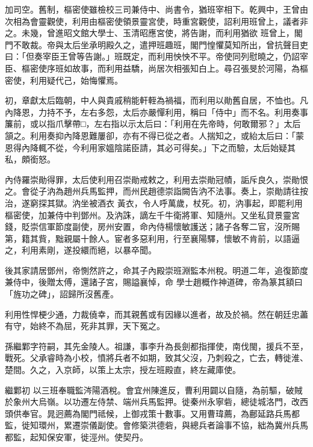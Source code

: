 \begin{pinyinscope}
 加司空。舊制，樞密使雖檢校三司兼侍中、尚書令，猶班宰相下。乾興中，王曾由次相為會靈觀使，利用由樞密使領景靈宮使，時重宮觀使，詔利用班曾上，議者非之。未幾，曾進昭文館大學士、玉清昭應宮使，將告謝，而利用猶欲
 班曾上，閣門不敢裁。帝與太后坐承明殿久之，遣押班趣班，閣門惶懼莫知所出，曾抗聲目吏曰：「但奏宰臣王曾等告謝。」班既定，而利用怏怏不平。帝使同列慰曉之，仍詔宰臣、樞密使序班如故事，而利用益驕，尚居次相張知白上。尋召張旻於河陽，為樞密使，利用疑代己，始悔懼焉。



 初，章獻太后臨朝，中人與貴戚稍能軒輊為禍福，而利用以勛舊自居，不恤也。凡內降恩，力持不予，左右多怨，太后亦嚴憚利用，稱曰「侍中」而不名。利用奏事
 簾前，或以指爪擊帶□，左右指以示太后曰：「利用在先帝時，何敢爾邪？」太后頷之。利用奏抑內降恩難屢卻，亦有不得已從之者。人揣知之，或紿太后曰：「蒙恩得內降輒不從，今利用家媼陰諾臣請，其必可得矣。」下之而驗，太后始疑其私，頗銜怒。



 內侍羅崇勛得罪，太后使利用召崇勛戒敕之，利用去崇勛冠幘，詬斥良久，崇勛恨之。會從子汭為趙州兵馬監押，而州民趙德崇詣闕告汭不法事。奏上，崇勛請往按治，遂窮探其獄。汭坐被酒衣
 黃衣，令人呼萬歲，杖死。初，汭事起，即罷利用樞密使，加兼侍中判鄧州。及汭誅，謫左千牛衛將軍、知隨州。又坐私貸景靈宮錢，貶崇信軍節度副使，房州安置，命內侍楊懷敏護送；諸子各奪二官，沒所賜第，籍其貲，黜親屬十餘人。宦者多惡利用，行至襄陽驛，懷敏不肯前，以語逼之，利用素剛，遂投繯而絕，以暴卒聞。



 後其家請居鄧州，帝惻然許之，命其子內殿崇班淵監本州稅。明道二年，追復節度兼侍中，後贈太傅，還諸子宮，賜謚襄悼，命
 學士趙概作神道碑，帝為篆其額曰「旌功之碑」，詔歸所沒舊產。



 利用性悍梗少通，力裁僥幸，而其親舊或有因緣以進者，故及於禍。然在朝廷忠藎有守，始終不為屈，死非其罪，天下冤之。



 孫繼鄴字符嗣，其先金陵人。祖謙，事李升為長劍都指揮使，南伐閩，援兵不至，戰死。父承睿時為小校，憤將兵者不如期，致其父沒，乃刺殺之，亡去，轉徙淮、楚間。久之，入京師，以策上太宗，授左班殿直，終左藏庫使。



 繼鄴初
 以三班奉職監涔陽酒稅。會宜州陳進反，曹利用闢以自隨，為前驅，破賊於象州大烏嶺。以功遷左侍禁、端州兵馬監押。徙秦州永寧砦，總徒城洛門，改西頭供奉官。晁迥薦為閣門祗候，上御戎策十數事。又用曹瑋薦，為鄜延路兵馬都監，徙知環州，累遷崇儀副使。會修築洪德砦，與總兵者論事不協，絀為冀州兵馬都監，起知保安軍，徙涇州。使契丹。




\end{pinyinscope}
